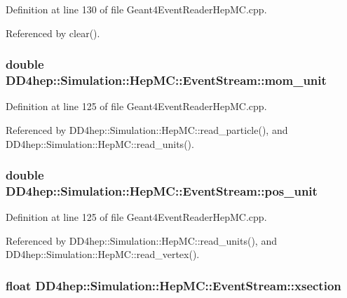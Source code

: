 Definition at line 130 of file Geant4EventReaderHepMC.cpp.

Referenced by clear().\hypertarget{class_d_d4hep_1_1_simulation_1_1_hep_m_c_1_1_event_stream_a3f8d6aeef7a8fa342bc15e7b17eb7d40}{
\subsubsection[{mom\_\-unit}]{\setlength{\rightskip}{0pt plus 5cm}double {\bf DD4hep::Simulation::HepMC::EventStream::mom\_\-unit}}}
\label{class_d_d4hep_1_1_simulation_1_1_hep_m_c_1_1_event_stream_a3f8d6aeef7a8fa342bc15e7b17eb7d40}


Definition at line 125 of file Geant4EventReaderHepMC.cpp.

Referenced by DD4hep::Simulation::HepMC::read\_\-particle(), and DD4hep::Simulation::HepMC::read\_\-units().\hypertarget{class_d_d4hep_1_1_simulation_1_1_hep_m_c_1_1_event_stream_ab528124a867412138e1d22b2310c1bad}{
\subsubsection[{pos\_\-unit}]{\setlength{\rightskip}{0pt plus 5cm}double {\bf DD4hep::Simulation::HepMC::EventStream::pos\_\-unit}}}
\label{class_d_d4hep_1_1_simulation_1_1_hep_m_c_1_1_event_stream_ab528124a867412138e1d22b2310c1bad}


Definition at line 125 of file Geant4EventReaderHepMC.cpp.

Referenced by DD4hep::Simulation::HepMC::read\_\-units(), and DD4hep::Simulation::HepMC::read\_\-vertex().\hypertarget{class_d_d4hep_1_1_simulation_1_1_hep_m_c_1_1_event_stream_a3f6b9fa99fe2752282e3650c51ad4918}{
\subsubsection[{xsection}]{\setlength{\rightskip}{0pt plus 5cm}float {\bf DD4hep::Simulation::HepMC::EventStream::xsection}}}
\label{class_d_d4hep_1_1_simulation_1_1_hep_m_c_1_1_event_stream_a3f6b9fa99fe2752282e3650c51ad4918}


